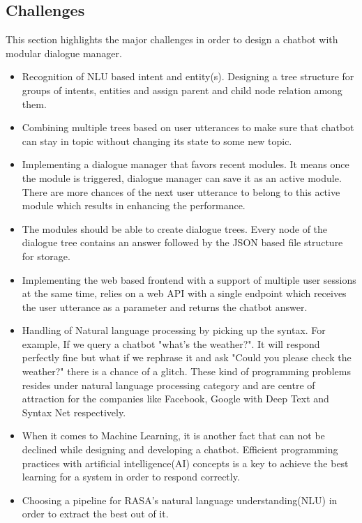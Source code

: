 \subsection{Challenges}
This section highlights the major challenges in order to design a chatbot with modular dialogue manager. 
\begin{itemize}
  \item Recognition of NLU based intent and entity(s). Designing a tree structure for groups of intents, entities and assign parent and child node relation among them.
   \item Combining multiple trees based on user utterances to make sure that chatbot can stay in topic without changing its state to some new topic.
   \item Implementing a dialogue manager that favors recent modules. It means once the module is triggered, dialogue manager can save it as an active module. There are more chances of the next user utterance to belong to this active module which results in enhancing the performance.
   \item The modules should be able to create dialogue trees. Every node of
   the dialogue tree contains an answer followed by the JSON based file structure for storage.
   \item Implementing the web based frontend with a support of multiple user sessions at the same time, relies on a web API with a single endpoint which receives the user utterance as a parameter and returns the chatbot answer.
   \item Handling of Natural language processing by picking up the syntax. For example, If we query a chatbot "what's the weather?". It will respond perfectly fine but what if we rephrase it and ask "Could you please check the weather?" there is a chance of a glitch. These kind of programming problems resides under natural language processing category and are centre of attraction for the companies like Facebook, Google with Deep Text and Syntax Net respectively. \cite{ProgrammingchallengesofChatbot}
   \item When it comes to Machine Learning, it is another fact that can not be declined while designing and developing a chatbot. Efficient programming practices with artificial intelligence(AI) concepts is a key to achieve the best learning for a system in order to respond correctly.
   \cite{ProgrammingchallengesofChatbot}
   \item Choosing a pipeline for RASA's natural language understanding(NLU) in order to extract the best out of it.
\end{itemize}

